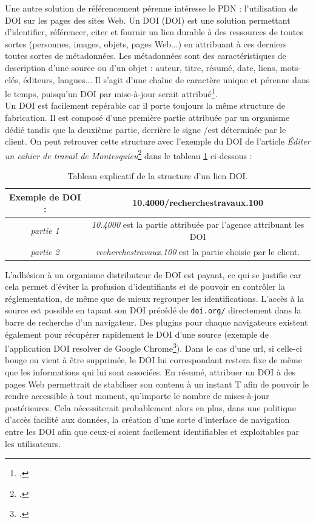 \documentclass[a4paper,12pt,twoside]{book}
\begin{document}
Une autre solution de référencement pérenne intéresse le \acrshort{PDN} : l'utilisation de DOI sur les pages des sites Web. Un DOI (\acrlong{DOI}) est une solution permettant d'identifier, référencer, citer et fournir un lien durable à des ressources de toutes sortes (personnes, images, objets, pages Web...) en attribuant à ces derniers toutes sortes de métadonnées. Les métadonnées sont des caractéristiques de description d'une source ou d'un objet : auteur, titre, résumé, date, liens, mots-clés, éditeurs, langues... Il s'agit d'une chaîne de caractère unique et pérenne dans le temps, puisqu'un DOI par mise-à-jour serait attribué\footcite{DOI}. \\
   Un DOI est facilement repérable car il porte toujours la même structure de fabrication. Il est composé d'une première partie attribuée par un organisme dédié tandis que la deuxième partie, derrière le signe \og /\fg est déterminée par le client. On peut retrouver cette structure avec l'exemple du DOI de l'article \og \textit{Éditer un cahier de travail de Montesquieu}\footcite{montesquieu}\fg{} dans le tableau \ref{DOI} ci-dessous :
   
   \begin{table}[H]
\centering
\begin{tabular}{|c|c|}
\hline
 \cellcolor{lightgray}Exemple de DOI : &  \textbf{10.4000/recherchestravaux.100} \\
\hline
\textit{partie 1} & \textit{10.4000} est la partie attribuée par l'agence attribuant les DOI \\
\hline
\textit{partie 2} & \textit{recherchestravaux.100} est la partie choisie par le client. \\
\hline
\end{tabular}
\caption{Tableau explicatif de la structure d'un lien DOI.}
\label{DOI}
\end{table}

L'adhésion à un organisme distributeur de DOI est payant, ce qui se justifie car cela permet d'éviter la profusion d'identifiants et de pouvoir en contrôler la réglementation, de même que de mieux regrouper les identifications. L'accès à la source est possible en tapant son DOI précédé de \texttt{doi.org/} directement dans la barre de recherche d'un navigateur. Des plugins pour chaque navigateurs existent également pour récupérer rapidement le DOI d'une source (exemple de l'application \og DOI resolver \fg{} de Google Chrome\footcite{doi-resolver}). Dans le cas d'une url, si celle-ci bouge ou vient à être supprimée, le DOI lui correspondant restera fixe de même que les informations qui lui sont associées. En résumé, attribuer un DOI à des pages Web permettrait de stabiliser son contenu à un instant T afin de pouvoir le rendre accessible à tout moment, qu'importe le nombre de mises-à-jour postérieures. Cela nécessiterait probablement alors en plus, dans une politique d'accès facilité aux données, la création d'une sorte d'interface de navigation entre les DOI afin que ceux-ci soient facilement identifiables et exploitables par les utilisateurs.
\end{document}
